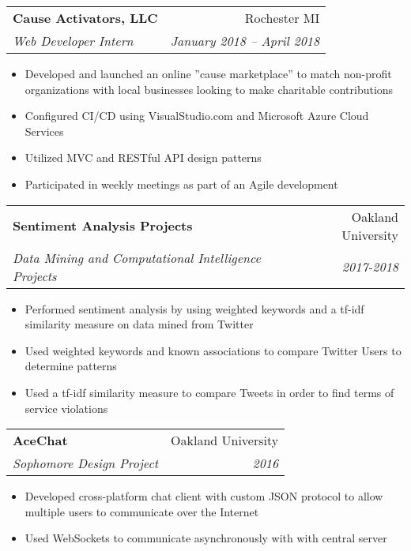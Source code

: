 \documentclass[letterpaper,10pt]{article}
\makeatletter
\newlength{\listsep}
\newcommand{\resitem}[1]{\item #1 \vspace{-2pt}}
\newcommand{\resheading}[1]{\vspace{4pt}
  \parbox{\textwidth}{
      \framebox[\textwidth][l]{
          {\textbf{\sffamily{\large #1}}}
      }
  }
}
\newcommand{\ressubheading}[4]{
\begin{tabular*}{\textwidth}{l@{\cftdotfill{\cftsecdotsep}\extracolsep{\fill}}r}
        \textbf{#1} & #2 \\
        \textit{#3} & \textit{#4} \\
\end{tabular*}\vspace{-6pt}}
\makeatother
\begin{document}
\ressubheading{Cause Activators, LLC}{Rochester MI}{Web Developer Intern}{January 2018 -- April 2018}
\begin{itemize}\itemsep \listsep \small
      \resitem{Developed and launched an online ”cause marketplace” to match
      non-profit organizations with local businesses looking to make charitable
      contributions}
      \resitem{Configured CI/CD using VisualStudio.com and Microsoft Azure Cloud
      Services}
      \resitem{Utilized MVC and RESTful API design patterns}
      \resitem{Participated in weekly meetings as part of an Agile development}

\end{itemize}

\resheading{Projects}

\vspace{-0.5\baselineskip}
\ressubheading{\bf Sentiment Analysis Projects}{Oakland University}{Data Mining and Computational Intelligence Projects}{2017-2018}
\begin{itemize}\itemsep \listsep \small
      \resitem{Performed sentiment analysis by using weighted keywords and a tf-idf similarity measure on data mined from Twitter}
      \resitem{Used weighted keywords and known associations to compare Twitter Users to determine patterns}
      \resitem{Used a tf-idf similarity measure to compare Tweets in order to find terms of service violations}
\end{itemize}

\ressubheading{\bf AceChat}{Oakland University}{Sophomore Design Project}{2016}
\begin{itemize}\itemsep \listsep \small
      \resitem{Developed cross-platform chat client with custom JSON protocol to allow multiple users to communicate over the Internet}
      \resitem{Used WebSockets to communicate asynchronously with with central server}
\end{itemize}

    

\resheading{Skills}

\vspace{-0.5\baselineskip}
    
\end{document}
